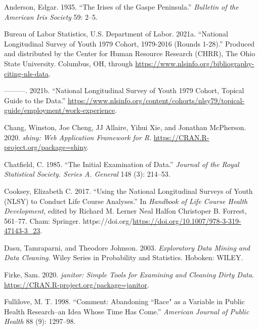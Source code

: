 \documentclass{article}
\newlength{\cslhangindent}
\newlength{\cslentryspacingunit} %
\newenvironment{CSLReferences}[2] %
 {%
  \setlength{\parindent}{0pt}
  \ifodd #1
  \let\oldpar\par
  \def\par{\hangindent=\cslhangindent\oldpar}
  \fi
  \setlength{\parskip}{#2\cslentryspacingunit}
 }%
 {}
\begin{document}
\hypertarget{refs}{}
\begin{CSLReferences}{1}{0}
\leavevmode{}%
Anderson, Edgar. 1935. {``The Irises of the Gaspe Peninsula.''} \emph{Bulletin of the American Iris Society} 59: 2--5.

\leavevmode{}%
Bureau of Labor Statistics, U.S. Department of Labor. 2021a. {``National Longitudinal Survey of Youth 1979 Cohort, 1979-2016 (Rounds 1-28).''} Produced and distributed by the Center for Human Resource Research (CHRR), The Ohio State University. Columbus, OH, through \url{https://www.nlsinfo.org/bibliography-citing-nls-data}.

\leavevmode{}%
---------. 2021b. {``National Longitudinal Survey of Youth 1979 Cohort, Topical Guide to the Data.''} \url{https://www.nlsinfo.org/content/cohorts/nlsy79/topical-guide/employment/work-experience}.

\leavevmode{}%
Chang, Winston, Joe Cheng, JJ Allaire, Yihui Xie, and Jonathan McPherson. 2020. \emph{{shiny: Web Application Framework for R}}. \url{https://CRAN.R-project.org/package=shiny}.

\leavevmode{}%
Chatfield, C. 1985. {``The Initial Examination of Data.''} \emph{Journal of the Royal Statistical Society. Series A. General} 148 (3): 214--53.

\leavevmode{}%
Cooksey, Elizabeth C. 2017. {``Using the National Longitudinal Surveys of Youth ({NLSY}) to Conduct Life Course Analyses.''} In \emph{Handbook of Life Course Health Development}, edited by Richard M. Lerner Neal Halfon Christoper B. Forrest, 561--77. Cham: Springer. https://doi.org/\url{https://doi.org/10.1007/978-3-319-47143-3_23}.

\leavevmode{}%
Dasu, Tamraparni, and Theodore Johnson. 2003. \emph{Exploratory Data Mining and Data Cleaning}. Wiley Series in Probability and Statistics. Hoboken: WILEY.

\leavevmode{}%
Firke, Sam. 2020. \emph{{janitor: Simple Tools for Examining and Cleaning Dirty Data}}. \url{https://CRAN.R-project.org/package=janitor}.

\leavevmode{}%
Fullilove, M. T. 1998. {``Comment: Abandoning ``Race" as a Variable in Public Health Research--an Idea Whose Time Has Come.''} \emph{American Journal of Public Health} 88 (9): 1297--98.


\end{CSLReferences}
\end{document}
